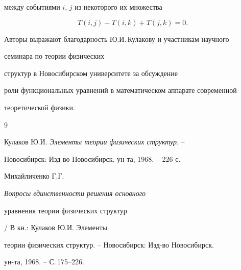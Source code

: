 между событиями $i$, $j$ из некоторого их множества


$$ 


T(i,j)-T(i,k)+T(j,k)=0. 


$$ 


 


Авторы выражают благодарность Ю.И.\,Кулакову и участникам научного 


семинара по теории физических


структур в Новосибирском университете за обсуждение 


роли функциональных уравнений в математическом аппарате современной 


теоретической физики. 





\begin{thebibliography}{9}







Кулаков Ю.И. {\em Элементы теории физических структур}. -- 


Новосибирск: Изд-во Новосибирск. ун-та, 1968. -- 226 с. 




Михайличенко Г.Г. {\em Вопросы единственности решения основного 


уравнения теории физических структур} / В кн.: Кулаков Ю.И. Элементы 


теории физических структур. -- Новосибирск: Изд-во Новосибирск. 


ун-та, 1968. -- С.\,175--226. 





\end{thebibliography}





\vskip 2cm














\label{end}





